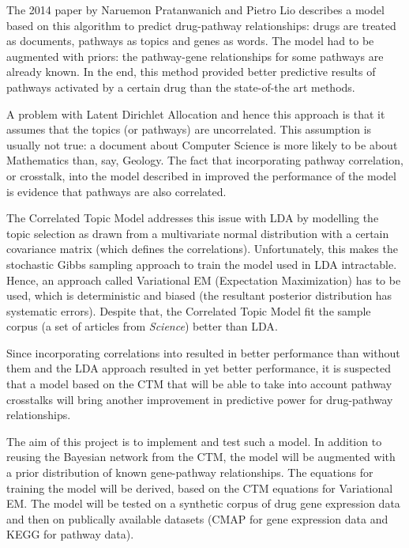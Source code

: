 \documentclass[12pt,a4]{article}
\begin{document}
The 2014 paper\cite{Pratanwanich2014} by Naruemon Pratanwanich and Pietro Lio describes a model based on this algorithm to predict drug-pathway relationships:  drugs are treated as documents, pathways as topics and genes as words. The model had to be augmented with priors: the pathway-gene relationships for some pathways are already known. In the end, this method provided better predictive results of pathways activated by a certain drug than the state-of-the art methods.

A problem with Latent Dirichlet Allocation and hence this approach is that it assumes that the topics (or pathways) are uncorrelated. This assumption is usually not true: a document about Computer Science is more likely to be about Mathematics than, say, Geology. The fact that incorporating pathway correlation, or crosstalk, into the model described in\cite{C4MB00014E} improved the performance of the model is evidence that pathways are also correlated.

The Correlated Topic Model\cite{2007} addresses this issue with LDA by modelling the topic selection as drawn from a multivariate normal distribution with a certain covariance matrix (which defines the correlations). Unfortunately, this makes the stochastic Gibbs sampling approach to train the model used in LDA intractable. Hence, an approach called Variational EM (Expectation Maximization) has to be used, which is deterministic and biased (the resultant posterior distribution has systematic errors). Despite that, the Correlated Topic Model fit the sample corpus (a set of articles from {\em Science}) better than LDA\cite{2007}.

Since incorporating correlations into \cite{C4MB00014E} resulted in better performance than without them and the LDA approach resulted in yet better performance, it is suspected that a model based on the CTM that will be able to take into account pathway crosstalks will bring another improvement in predictive power for drug-pathway relationships.

The aim of this project is to implement and test such a model. In addition to reusing the Bayesian network from the CTM, the model will be augmented with a prior distribution of known gene-pathway relationships. The equations for training the model will be derived, based on the CTM equations for Variational EM. The model will be tested on a synthetic corpus of drug gene expression data and then on publically available datasets (CMAP\cite{CMap} for gene expression data and KEGG\cite{KEGG} for pathway data). 
\end{document}
